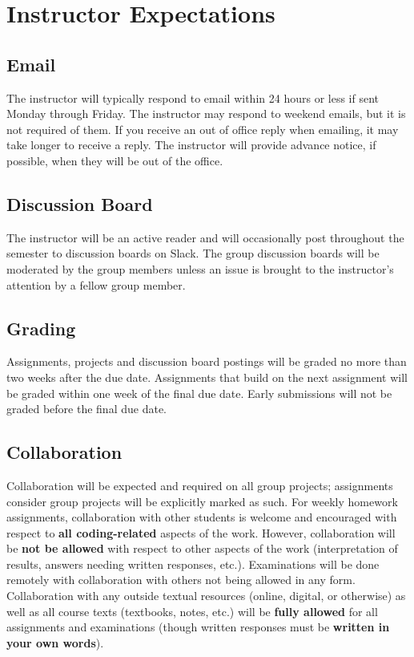 \documentclass[11pt]{article}
\begin{document}
\section*{Instructor Expectations}
\subsection*{Email}
The instructor will typically respond to email within 24 hours or less if sent Monday through Friday. The instructor may respond to weekend emails, but it is not required of them. If you receive an out of office reply when emailing, it may take longer to receive a reply. The instructor will provide advance notice, if possible, when they will be out of the office.

\subsection*{Discussion Board}
The instructor will be an active reader and will occasionally post throughout the semester to discussion boards on Slack. The group discussion boards will be moderated by the group members unless an issue is brought to the instructor’s attention by a fellow group member.

\subsection*{Grading}
Assignments, projects and discussion board postings will be graded no more than two weeks after the due date. Assignments that build on the next assignment will be graded within one week of the final due date.
Early submissions will not be graded before the final due date.

\subsection*{Collaboration}
Collaboration will be expected and required on all group projects; assignments consider group projects will be explicitly marked as such.  For weekly homework assignments, collaboration with other students is welcome and encouraged with respect to \textbf{all coding-related} aspects of the work.  However, collaboration will be \textbf{not be allowed} with respect to other aspects of the work (interpretation of results, answers needing written responses, etc.).  Examinations will be done remotely with collaboration with others not being allowed in any form.  Collaboration with any outside textual resources (online, digital, or otherwise) as well as all course texts (textbooks, notes, etc.) will be \textbf{fully allowed} for all assignments and examinations (though written responses must be \textbf{written in your own words}).
\end{document}
